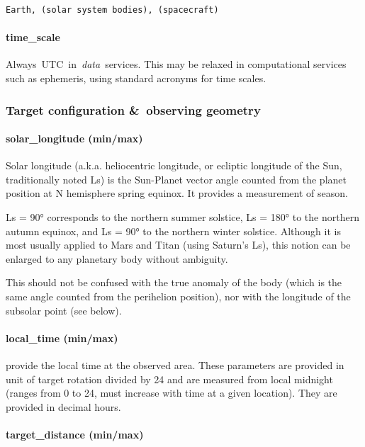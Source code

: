 \documentclass[11pt,a4paper]{ivoa}
\begin{document}
\begin{verbatim}
Earth, (solar system bodies), (spacecraft)
\end{verbatim}




\paragraph{time\_scale}

Always UTC in \emph{data} services. This may be relaxed in computational services such as ephemeris, using standard acronyms for time scales.

\subsubsection{Target configuration \& observing geometry}

\paragraph{solar\_longitude (min/max)}

Solar longitude (a.k.a. heliocentric longitude, or ecliptic longitude of the Sun, traditionally noted Ls) is the Sun-Planet vector angle counted from the planet position at N hemisphere spring equinox. It provides a measurement of season.

Ls = 90° corresponds to the northern summer solstice, Ls = 180° to the northern autumn equinox, and Ls = 90° to the northern winter solstice. Although it is most usually applied to Mars and Titan (using Saturn's Ls), this notion can be enlarged to any planetary body without ambiguity.

This should not be confused with the true anomaly of the body (which is the same angle counted from the perihelion position), nor with the longitude of the subsolar point (see below).

\paragraph{local\_time (min/max)}

provide the local time at the observed area. These parameters are provided in unit of target rotation divided by 24 and are measured from local midnight (ranges from 0 to 24, must increase with time at a given location). They are provided in decimal hours.

\paragraph{target\_distance (min/max)}
\end{document}
